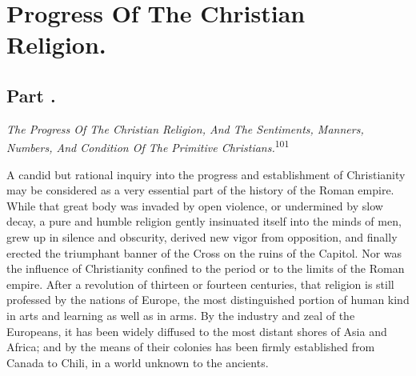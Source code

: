 \chapter{Progress Of The Christian Religion.}
\section{Part \thesection.}

\textit{The Progress Of The Christian Religion, And The Sentiments,
Manners, Numbers, And Condition Of The Primitive Christians.}\textsuperscript{101}
\vspace{\onelineskip}


A candid but rational inquiry into the progress and establishment
of Christianity may be considered as a very essential part of the
history of the Roman empire. While that great body was invaded by
open violence, or undermined by slow decay, a pure and humble
religion gently insinuated itself into the minds of men, grew up
in silence and obscurity, derived new vigor from opposition, and
finally erected the triumphant banner of the Cross on the ruins
of the Capitol. Nor was the influence of Christianity confined to
the period or to the limits of the Roman empire. After a
revolution of thirteen or fourteen centuries, that religion is
still professed by the nations of Europe, the most distinguished
portion of human kind in arts and learning as well as in arms. By
the industry and zeal of the Europeans, it has been widely
diffused to the most distant shores of Asia and Africa; and by
the means of their colonies has been firmly established from
Canada to Chili, in a world unknown to the ancients.

